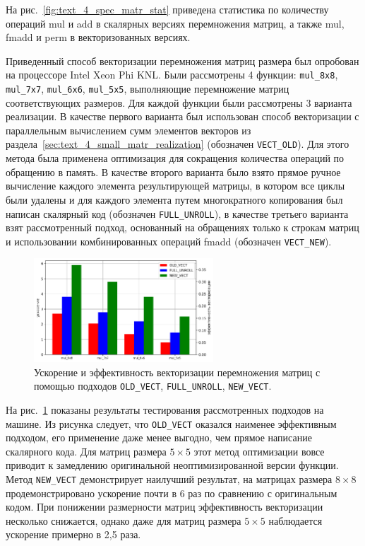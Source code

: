 На рис.~\ref{fig:text_4_spec_matr_stat} приведена статистика по количеству операций mul и add в скалярных версиях перемножения матриц, а также mul, fmadd и perm в векторизованных версиях.

Приведенный способ векторизации перемножения матриц размера был опробован на процессоре Intel Xeon Phi KNL.
Были рассмотрены 4 функции: \texttt{mul\_8x8}, \texttt{mul\_7x7}, \texttt{mul\_6x6}, \texttt{mul\_5x5}, выполняющие перемножение матриц соответствующих размеров.
Для каждой функции были рассмотрены 3 варианта реализации.
В качестве первого варианта был использован способ векторизации с параллельным вычислением сумм элементов векторов из раздела~\ref{sec:text_4_small_matr_realization} (обозначен \texttt{VECT\_OLD}).
Для этого метода была применена оптимизация для сокращения количества операций по обращению в память.
В качестве второго варианта было взято прямое ручное вычисление каждого элемента результирующей матрицы, в котором все циклы были удалены и для каждого элемента путем многократного копирования был написан скалярный код (обозначен \texttt{FULL\_UNROLL}), в качестве третьего варианта взят рассмотренный подход, основанный на обращениях только к строкам матриц и использовании комбинированных операций fmadd (обозначен \texttt{VECT\_NEW}).

\begin{figure}[ht]
\centering
\includegraphics[width=0.6\textwidth]{./fig/vec_spec_matrices_res.png}
\singlespacing
{}\caption{Ускорение и эффективность векторизации перемножения матриц с помощью подходов \texttt{OLD\_VECT}, \texttt{FULL\_UNROLL}, \texttt{NEW\_VECT}.}
\label{fig:text_4_spec_matr_res}
\end{figure}

На рис.~\ref{fig:text_4_spec_matr_res} показаны результаты тестирования рассмотренных подходов на машине.
Из рисунка следует, что \texttt{OLD\_VECT} оказался наименее эффективным подходом, его применение даже менее выгодно, чем прямое написание скалярного кода.
Для матриц размера $5 \times 5$ этот метод оптимизации вовсе приводит к замедлению оригинальной неоптимизированной версии функции.
Метод \texttt{NEW\_VECT} демонстрирует наилучший результат, на матрицах размера $8 \times 8$ продемонстрировано ускорение почти в 6 раз по сравнению с оригинальным кодом.
При понижении размерности матриц эффективность векторизации несколько снижается, однако даже для матриц размера $5 \times 5$ наблюдается ускорение примерно в 2,5 раза.

